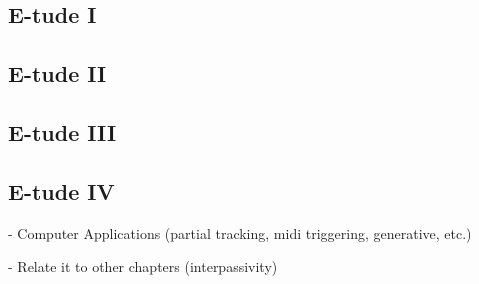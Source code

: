 \subsection*{E-tude I}

\subsection*{E-tude II}

\subsection*{E-tude III}

\subsection*{E-tude IV}

- Computer Applications (partial tracking, midi triggering, generative, etc.)

- Relate it to other chapters (interpassivity)


